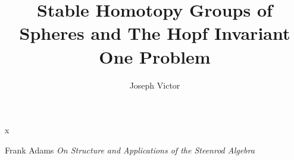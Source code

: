 \documentclass[a4paper,12pt]{article}
\begin{document}
\title{Stable Homotopy Groups of Spheres and The Hopf Invariant One Problem}x
\author{Joseph Victor}
\maketitle







\begin{thebibliography}{99}

  Frank Adams
  \emph{On Structure and Applications of the Steenrod Algebra}
  

\end{thebibliography}
\end{document}
